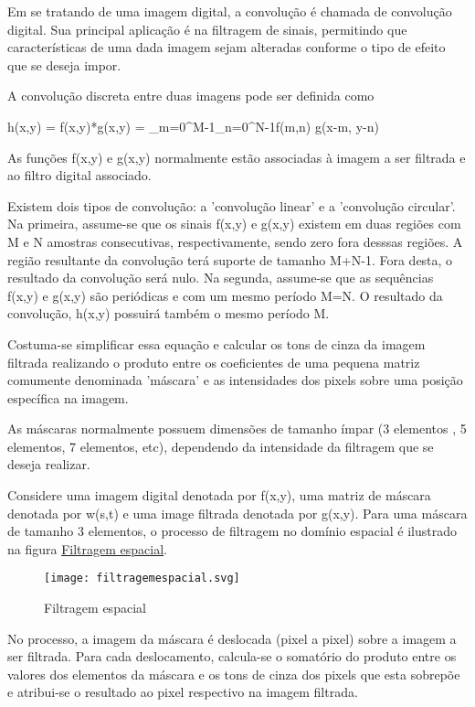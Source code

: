 \documentclass[11pt]{amsbook}
\begin{document}
Em se tratando de uma imagem digital, a convolução é chamada de
convolução digital. Sua principal aplicação é na filtragem de sinais,
permitindo que características de uma dada imagem sejam alteradas
conforme o tipo de efeito que se deseja impor.


A convolução discreta entre duas imagens pode ser definida como


h(x,y) = f(x,y)*g(x,y) = 
\sum_{m=0}^{M-1}\sum_{n=0}^{N-1}f(m,n) g(x-m, y-n)


As funções f(x,y) e g(x,y) normalmente estão associadas
à imagem a ser filtrada e ao filtro digital associado.


Existem dois tipos de convolução: a 'convolução linear' e a
'convolução circular'. Na primeira, assume-se que os sinais
f(x,y) e g(x,y) existem em duas regiões com M e N
amostras consecutivas, respectivamente, sendo zero fora desssas
regiões. A região resultante da convolução terá suporte de tamanho
M+N-1. Fora desta, o resultado da convolução será nulo. Na
segunda, assume-se que as sequências f(x,y) e g(x,y) são
periódicas e com um mesmo período M=N. O resultado da
convolução, h(x,y) possuirá também o mesmo período M.


Costuma-se simplificar essa equação e calcular os tons de cinza da
imagem filtrada realizando o produto entre os coeficientes de uma
pequena matriz comumente denominada 'máscara' e as intensidades dos
pixels sobre uma posição específica na imagem.


As máscaras normalmente possuem dimensões de tamanho ímpar (3
 elementos , 5  elementos, 7 
elementos, etc), dependendo da intensidade da filtragem que se deseja
realizar.


Considere uma imagem digital denotada por f(x,y), uma matriz de
máscara denotada por w(s,t) e uma image filtrada denotada por
g(x,y). Para uma máscara de tamanho 3 
elementos, o processo de filtragem no domínio espacial é ilustrado na
figura \hyperlink{fig-filtragemespacial}{Filtragem espacial}.


\begin{figure}[h]{}
\centering\texttt{[image: filtragemespacial.svg]}
\caption{Filtragem espacial}

\end{figure}

No processo, a imagem da máscara é deslocada (pixel a pixel) sobre a
imagem a ser filtrada. Para cada deslocamento, calcula-se o somatório
do produto entre os valores dos elementos da máscara e os tons de
cinza dos pixels que esta sobrepõe e atribui-se o resultado ao pixel
respectivo na imagem filtrada.
\end{document}
